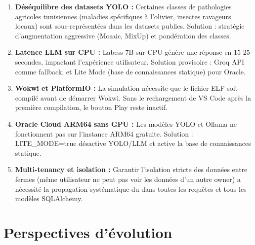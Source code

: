 \begin{enumerate}
  \item \textbf{Déséquilibre des datasets YOLO :} Certaines classes de pathologies
        agricoles tunisiennes (maladies spécifiques à l'olivier, insectes ravageurs
        locaux) sont sous-représentées dans les datasets publics. Solution : stratégie
        d'augmentation aggressive (Mosaic, MixUp) et pondération des classes.

  \item \textbf{Latence LLM sur CPU :} Labess-7B sur CPU génère une réponse en 15-25
        secondes, impactant l'expérience utilisateur. Solution provisoire : Groq API
        comme fallback, et Lite Mode (base de connaissances statique) pour Oracle.

  \item \textbf{Wokwi et PlatformIO :} La simulation nécessite que le fichier ELF
        soit compilé avant de démarrer Wokwi. Sans le rechargement de VS Code après
        la première compilation, le bouton Play reste inactif.

  \item \textbf{Oracle Cloud ARM64 sans GPU :} Les modèles YOLO et Ollama ne fonctionnent
        pas sur l'instance ARM64 gratuite. Solution : LITE\_MODE=true désactive YOLO/LLM
        et active la base de connaissances statique.

  \item \textbf{Multi-tenancy et isolation :} Garantir l'isolation stricte des données
        entre fermes (même utilisateur ne peut pas voir les données d'un autre owner)
        a nécessité la propagation systématique du  dans toutes les
        requêtes et tous les modèles SQLAlchemy.
\end{enumerate}

\section{Perspectives d'évolution}

